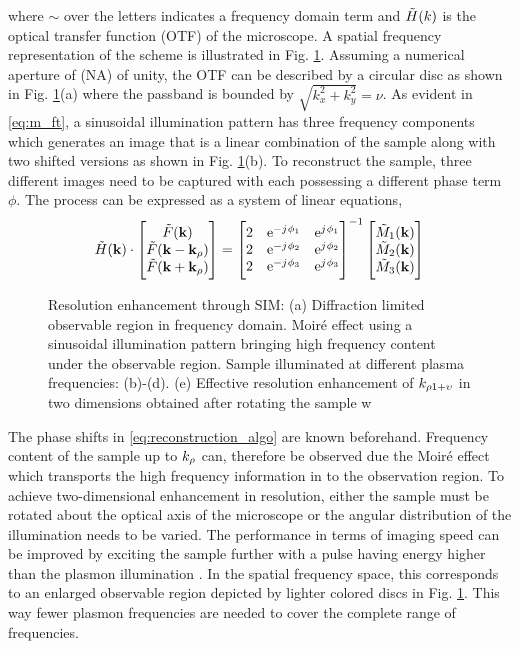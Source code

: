 \documentclass[11pt]{article}
\begin{document}
where $\sim$ over the letters indicates a frequency domain term and $\tilde{H}(k)$ is the optical transfer function (OTF) of the microscope. A spatial frequency representation of the scheme is illustrated in Fig. \ref{fig:sim}. Assuming a numerical aperture of (NA) of unity, the OTF can be described by a circular disc as shown in Fig. \ref{fig:sim}(a) where the passband is bounded by $\sqrt{k_x^2 + k_y^2} = \nu$. As evident in \eqref{eq:m_ft}, a sinusoidal illumination pattern has three frequency components which generates an image that is a linear combination of the sample along with two shifted versions as shown in Fig. \ref{fig:sim}(b). To reconstruct the sample, three different images need to be captured with each possessing a different phase term $\phi$. The process can be expressed as a system of linear equations,
%
\begin{equation}
  \tilde{H}(\mathbf{k}) \cdot
  \begin{bmatrix}
    \tilde{F}(\mathbf{k}) \\
    \tilde{F}(\mathbf{k} - \mathbf{k}_{\rho}) \\
    \tilde{F}(\mathbf{k} + \mathbf{k}_{\rho})
  \end{bmatrix}
  =
  \begin{bmatrix}
    2 & \mathrm{e}^{-j\mkern1mu \phi_1} & \mathrm{e}^{j\mkern1mu \phi_1} \\
    2 & \mathrm{e}^{-j\mkern1mu \phi_2} & \mathrm{e}^{j\mkern1mu \phi_2} \\
    2 & \mathrm{e}^{-j\mkern1mu \phi_3} & \mathrm{e}^{j\mkern1mu \phi_3} \\
  \end{bmatrix}^{-1}
  \begin{bmatrix}
   \tilde{M}_1(\mathbf{k}) \\
   \tilde{M}_2(\mathbf{k}) \\
   \tilde{M}_3(\mathbf{k})
  \end{bmatrix}
  \label{eq:reconstruction_algo}
\end{equation}
%
\begin{figure}[t!]
  \centering
  \def\svgwidth{.75\linewidth}
  
  \caption{Resolution enhancement through SIM: (a) Diffraction limited observable region in frequency domain.  Moiré effect using a sinusoidal illumination pattern bringing high frequency content under the observable region. Sample illuminated at different plasma frequencies: (b)-(d). (e) Effective resolution enhancement of $k_{\rho 1 + \upsilon}$ in two dimensions obtained after rotating the sample w}
  \label{fig:sim}
\end{figure}
%
The phase shifts in \eqref{eq:reconstruction_algo} are known beforehand. Frequency content of the sample up to $k_{\rho}$ can, therefore be observed due the Moiré effect which transports the high frequency information in to the observation region. To achieve two-dimensional enhancement in resolution, either the sample must be rotated about the optical axis of the microscope or the angular distribution of the illumination needs to be varied. The performance in terms of imaging speed can be improved by exciting the sample further with a pulse having energy higher than the plasmon illumination \cite{Zeng2015}. In the spatial frequency space, this corresponds to an enlarged observable region depicted by lighter colored discs in Fig. \ref{fig:sim}. This way fewer plasmon frequencies are needed to cover the complete range of frequencies.
\end{document}
